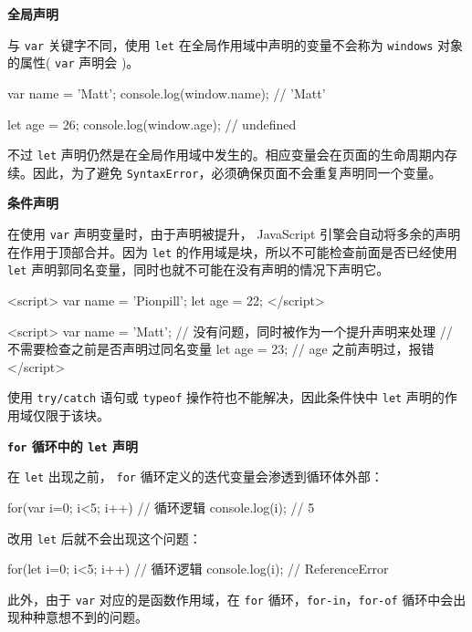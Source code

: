 \noindent\textbf{全局声明}

与 \texttt{var} 关键字不同，使用 \texttt{let} 在全局作用域中声明的变量不会称为 \texttt{windows} 对象的属性( \texttt{var} 声明会 )。

\begin{JavaScript}
var name = 'Matt';
console.log(window.name);   // 'Matt'

let age = 26;
console.log(window.age);    // undefined
\end{JavaScript}

不过 \texttt{let} 声明仍然是在全局作用域中发生的。相应变量会在页面的生命周期内存续。因此，为了避免 \texttt{SyntaxError}，必须确保页面不会重复声明同一个变量。

\noindent\textbf{条件声明}

在使用 \texttt{var} 声明变量时，由于声明被提升， JavaScript 引擎会自动将多余的声明在作用于顶部合并。因为 \texttt{let} 的作用域是块，所以不可能检查前面是否已经使用 \texttt{let} 声明郭同名变量，同时也就不可能在没有声明的情况下声明它。

\begin{JavaScript}
<script>
    var name = 'Pionpill';
    let age = 22;
</script>

<script>
    var name = 'Matt';
    // 没有问题，同时被作为一个提升声明来处理
    // 不需要检查之前是否声明过同名变量
    let age = 23;
    // age 之前声明过，报错
</script>
\end{JavaScript}

使用 \texttt{try/catch} 语句或 \texttt{typeof} 操作符也不能解决，因此条件快中 \texttt{let} 声明的作用域仅限于该块。

\noindent\textbf{\texttt{for} 循环中的 \texttt{let} 声明}

在 \texttt{let} 出现之前， \texttt{for} 循环定义的迭代变量会渗透到循环体外部：

\begin{JavaScript}
for(var i=0; i<5; i++) {
    // 循环逻辑
}
console.log(i);     // 5
\end{JavaScript}

改用 \texttt{let} 后就不会出现这个问题：

\begin{JavaScript}
for(let i=0; i<5; i++) {
    // 循环逻辑
}
console.log(i);     // ReferenceError
\end{JavaScript}

此外，由于 \texttt{var} 对应的是函数作用域，在 \texttt{for} 循环，\texttt{for-in}，\texttt{for-of} 循环中会出现种种意想不到的问题。

